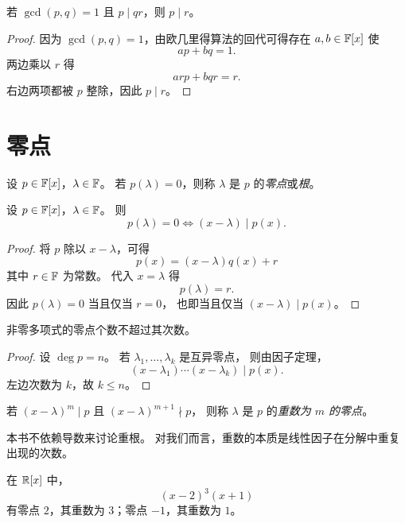 \begin{proposition}
若 $\gcd(p,q)=1$ 且 $p\mid qr$，则 $p\mid r$。
\end{proposition}

\begin{proof}
因为 $\gcd(p,q)=1$，由欧几里得算法的回代可得存在 $a,b\in\mathbb{F}[x]$ 使
\[
ap+bq=1.
\]
两边乘以 $r$ 得
\[
ar p+bqr=r.
\]
右边两项都被 $p$ 整除，因此 $p\mid r$。
\end{proof}

\section{零点}

\begin{definition}
设 $p\in\mathbb{F}[x]$，$\lambda\in\mathbb{F}$。
若 $p(\lambda)=0$，则称 $\lambda$ 是 $p$ 的\emph{零点}或\emph{根}。
\end{definition}

\begin{theorem}[因子定理]
设 $p\in\mathbb{F}[x]$，$\lambda\in\mathbb{F}$。
则
\[
p(\lambda)=0 \iff (x-\lambda)\mid p(x).
\]
\end{theorem}

\begin{proof}
将 $p$ 除以 $x-\lambda$，可得
\[
p(x)=(x-\lambda)q(x)+r
\]
其中 $r\in\mathbb{F}$ 为常数。
代入 $x=\lambda$ 得
\[
p(\lambda)=r.
\]
因此 $p(\lambda)=0$ 当且仅当 $r=0$，
也即当且仅当 $(x-\lambda)\mid p(x)$。
\end{proof}

\begin{corollary}
非零多项式的零点个数不超过其次数。
\end{corollary}

\begin{proof}
设 $\deg p=n$。
若 $\lambda_1,\dots,\lambda_k$ 是互异零点，
则由因子定理，
\[
(x-\lambda_1)\cdots(x-\lambda_k)\mid p(x).
\]
左边次数为 $k$，故 $k\le n$。
\end{proof}

\begin{definition}
若 $(x-\lambda)^m\mid p$ 且 $(x-\lambda)^{m+1}\nmid p$，
则称 $\lambda$ 是 $p$ 的\emph{重数为 $m$ 的零点}。
\end{definition}

\begin{remark}
本书不依赖导数来讨论重根。
对我们而言，重数的本质是线性因子在分解中重复出现的次数。
\end{remark}

\begin{example}
在 $\mathbb{R}[x]$ 中，
\[
(x-2)^3(x+1)
\]
有零点 $2$，其重数为 $3$；零点 $-1$，其重数为 $1$。
\end{example}

